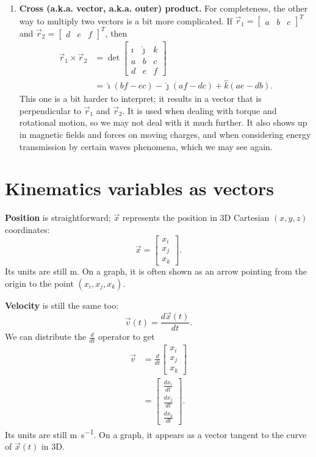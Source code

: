 \documentclass{tufte-handout}
\begin{document}
\begin{enumerate}
\item \textbf{Cross (a.k.a. vector, a.k.a. outer) product.} For completeness, the other way to multiply two vectors is a bit more complicated. If $\vec{r}_1 = \begin{bmatrix}a&b& c\end{bmatrix}^T$ and $\vec{r}_2 = \begin{bmatrix}d&e&f\end{bmatrix}^T$, then
\begin{align}
\vec{r}_1 \times \vec{r}_2 &= 
\det\begin{bmatrix} 
\hat{\imath} & \hat{\jmath} & \hat{k} \\
a & b & c \\
d & e & f 
\end{bmatrix} \\
&= \hat{\imath}(bf - ec) - \hat{\jmath} (af-dc) + \hat{k} (ae-db).
\end{align}
This one is a bit harder to interpret; it results in a vector that is perpendicular to $\vec{r}_1$ and $\vec{r}_2$. It is used when dealing with torque and rotational motion, so we may not deal with it much further. It also shows up in magnetic fields and forces on moving charges, and when considering energy transmission by certain waves phenomena, which we may see again. 
\end{enumerate}

\section{Kinematics variables as vectors}
\textbf{Position} is straightforward; $\vec{x}$ represents the position in 3D Cartesian $(x,y,z)$ coordinates:
\begin{equation}
\vec{x} = \begin{bmatrix} x_i \\ x_j \\ x_k \end{bmatrix}.
\end{equation}
Its units are still \si{\meter}. On a graph, it is often shown as an arrow pointing from the origin to the point $(x_i, x_j, x_k)$. 

\textbf{Velocity} is still the same too:
\begin{equation}
\vec{v}(t) = \dfrac{d\vec{x}(t)}{dt}.
\end{equation}
We can distribute the $\frac{d}{dt}$ operator to get
\begin{align}
\vec{v} &= \frac{d}{dt} \begin{bmatrix} x_i \\ x_j \\ x_k \end{bmatrix} \\
&= \begin{bmatrix} \frac{dx_i}{dt} \\ \frac{dx_j}{dt} \\ \frac{dx_k}{dt} \end{bmatrix}.
\end{align}
Its units are still \si{\meter\per\second}. On a graph, it appears as a vector tangent to the curve of $\vec{x}(t)$ in 3D. 
\end{document}
